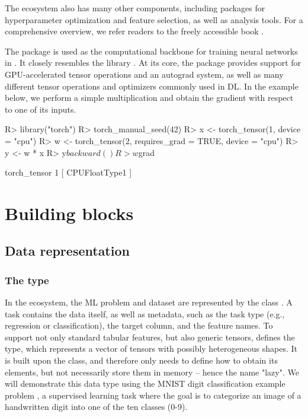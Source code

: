 \documentclass[article]{jss}
\theoremstyle{definition}
\begin{document}
The  ecosystem also has many other components, including packages for hyperparameter optimization and feature selection, as well as analysis tools.
For a comprehensive overview, we refer readers to the freely accessible book \citep{ref-mlr3book}.

The  package is used as the computational backbone for training neural networks in .
It closely resembles the \pytorch{} \python{} library \citep{ref-pytorch}.
At its core, the package provides support for GPU-accelerated tensor operations and an autograd system, as well as many different tensor operations and optimizers commonly used in DL.
In the example below, we perform a simple multiplication and obtain the gradient with respect to one of its inputs.

\begin{CodeInput}
R> library("torch")
R> torch_manual_seed(42)
R> x <- torch_tensor(1, device = "cpu")
R> w <- torch_tensor(2, requires_grad = TRUE, device = "cpu")
R> y <- w * x
R> y$backward()
R> w$grad
\end{CodeInput}
\begin{CodeOutput}
torch_tensor
 1
[ CPUFloatType{1} ]
\end{CodeOutput}

\section{Building blocks}\label{sec:building-blocks}

\subsection{Data representation}

\subsubsection[The lazy tensor type]{The  type}

In the  ecosystem, the ML problem and dataset are represented by the  class .
A task contains the data itself, as well as metadata, such as the task type (e.g., regression or classification), the target column, and the feature names.
To support not only standard tabular features, but also generic \torch{} tensors,  defines the  type, which represents a vector of tensors with possibly heterogeneous shapes.
It is built upon the  class, and therefore only needs to define how to obtain its elements, but not necessarily store them in memory -- hence the name "lazy".
We will demonstrate this data type using the MNIST digit classification example problem \citep{ref-mnist-2012}, a supervised learning task where the goal is to categorize an image of a handwritten digit into one of the ten classes (0-9).
\end{document}
